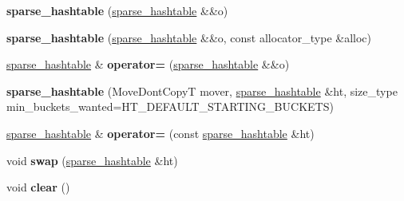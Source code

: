 \begin{DoxyCompactItemize}
\item 
{\bfseries sparse\+\_\+hashtable} (\hyperlink{classspp___1_1sparse__hashtable}{sparse\+\_\+hashtable} \&\&o)\hypertarget{classspp___1_1sparse__hashtable_aa3014f0c9441a121358d193e490cefa3}{}\label{classspp___1_1sparse__hashtable_aa3014f0c9441a121358d193e490cefa3}

\item 
{\bfseries sparse\+\_\+hashtable} (\hyperlink{classspp___1_1sparse__hashtable}{sparse\+\_\+hashtable} \&\&o, const allocator\+\_\+type \&alloc)\hypertarget{classspp___1_1sparse__hashtable_a03563648de3e60c5ce4f726e4fcf9b3f}{}\label{classspp___1_1sparse__hashtable_a03563648de3e60c5ce4f726e4fcf9b3f}

\item 
\hyperlink{classspp___1_1sparse__hashtable}{sparse\+\_\+hashtable} \& {\bfseries operator=} (\hyperlink{classspp___1_1sparse__hashtable}{sparse\+\_\+hashtable} \&\&o)\hypertarget{classspp___1_1sparse__hashtable_afbc4f991be276378e1bae0a4c8a0137d}{}\label{classspp___1_1sparse__hashtable_afbc4f991be276378e1bae0a4c8a0137d}

\item 
{\bfseries sparse\+\_\+hashtable} (Move\+Dont\+CopyT mover, \hyperlink{classspp___1_1sparse__hashtable}{sparse\+\_\+hashtable} \&ht, size\+\_\+type min\+\_\+buckets\+\_\+wanted=H\+T\+\_\+\+D\+E\+F\+A\+U\+L\+T\+\_\+\+S\+T\+A\+R\+T\+I\+N\+G\+\_\+\+B\+U\+C\+K\+E\+TS)\hypertarget{classspp___1_1sparse__hashtable_aa801385c70a58f827efcf042c3e9070f}{}\label{classspp___1_1sparse__hashtable_aa801385c70a58f827efcf042c3e9070f}

\item 
\hyperlink{classspp___1_1sparse__hashtable}{sparse\+\_\+hashtable} \& {\bfseries operator=} (const \hyperlink{classspp___1_1sparse__hashtable}{sparse\+\_\+hashtable} \&ht)\hypertarget{classspp___1_1sparse__hashtable_adee96730fdf753b1f5d52721d74ea2fa}{}\label{classspp___1_1sparse__hashtable_adee96730fdf753b1f5d52721d74ea2fa}

\item 
void {\bfseries swap} (\hyperlink{classspp___1_1sparse__hashtable}{sparse\+\_\+hashtable} \&ht)\hypertarget{classspp___1_1sparse__hashtable_a795f8feaeaba50f4823661eae2f79617}{}\label{classspp___1_1sparse__hashtable_a795f8feaeaba50f4823661eae2f79617}

\item 
void {\bfseries clear} ()\hypertarget{classspp___1_1sparse__hashtable_aa93e3715a270375da8574b73a96307fe}{}\label{classspp___1_1sparse__hashtable_aa93e3715a270375da8574b73a96307fe}


\end{DoxyCompactItemize}
